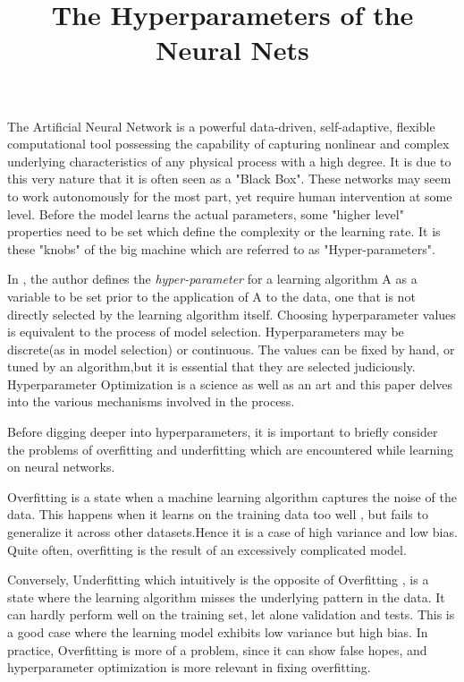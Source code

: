 \documentclass[twoside]{article}
\title{The Hyperparameters of the Neural Nets}
\author{}
\date{}
\begin{document}
\maketitle{}
The Artificial Neural Network is a powerful data-driven, self-adaptive, flexible computational tool possessing the capability of capturing nonlinear and complex underlying characteristics of any physical process with a high degree.\cite{wang2003artificial} It is due to this very nature that it is often seen as a "Black Box". These networks may seem to work autonomously for the most part, yet require human intervention at some level. Before the model learns the actual parameters, some "higher level" properties need to be set which define the complexity or the learning rate. It is these "knobs" of the big machine which are referred to as "Hyper-parameters". 

In \cite{bengio2000gradient}, the author defines the \textit{hyper-parameter} for a learning algorithm A as a variable to be set prior to the application of A to the data, one that is not directly selected by the learning algorithm itself. Choosing hyperparameter values is equivalent to the process of model selection. Hyperparameters may be discrete(as in model selection) or continuous. The values can be fixed by hand, or tuned by an algorithm,but it is essential that they are selected judiciously. Hyperparameter Optimization is a science as well as an art and this paper delves into the various mechanisms involved in the process.

Before digging deeper into hyperparameters, it is important to briefly consider the problems of overfitting and underfitting which are encountered while learning on neural networks.


Overfitting is a state when a machine learning algorithm captures the noise of the data. This happens when it learns on the training data too well , but fails to generalize it across other datasets.Hence it is a case of high variance and low bias.\cite{caruana2001overfitting} Quite often, overfitting is the result of an excessively complicated model.

Conversely, Underfitting which intuitively is the opposite of Overfitting , is a state where the learning algorithm misses the underlying pattern in the data. It can hardly perform well on the training set, let alone validation and tests. This is a good case where the learning model exhibits low variance but high bias. In practice, Overfitting is more of a problem, since it can show false hopes, and hyperparameter optimization is more relevant in fixing overfitting.
\end{document}
